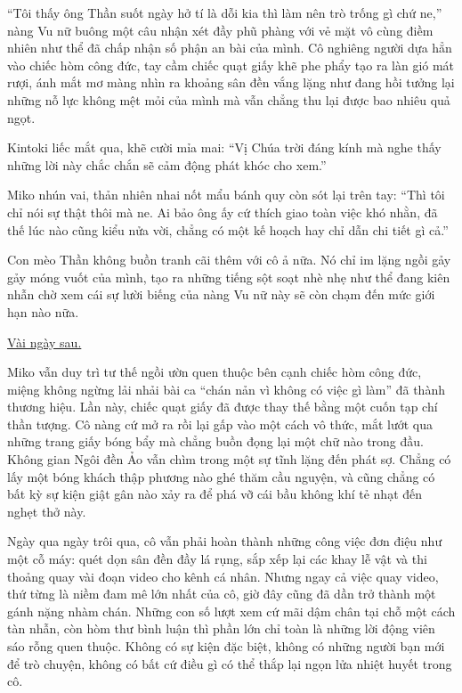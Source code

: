 \documentclass[../main.tex]{subfiles}
\begin{document}
``Tôi thấy ông Thần suốt ngày hở tí là dỗi kia thì làm nên trò trống gì chứ ne,'' nàng Vu nữ buông một câu nhận xét đầy phũ phàng với vẻ mặt vô cùng điềm nhiên như thể đã chấp nhận số phận an bài của mình. Cô nghiêng người dựa hẳn vào chiếc hòm công đức, tay cầm chiếc quạt giấy khẽ phe phẩy tạo ra làn gió mát rượi, ánh mắt mơ màng nhìn ra khoảng sân đền vắng lặng như đang hồi tưởng lại những nỗ lực không mệt mỏi của mình mà vẫn chẳng thu lại được bao nhiêu quả ngọt.

Kintoki liếc mắt qua, khẽ cười mỉa mai: ``Vị Chúa trời đáng kính mà nghe thấy những lời này chắc chắn sẽ cảm động phát khóc cho xem.''

Miko nhún vai, thản nhiên nhai nốt mẩu bánh quy còn sót lại trên tay: ``Thì tôi chỉ nói sự thật thôi mà ne. Ai bảo ông ấy cứ thích giao toàn việc khó nhằn, đã thế lúc nào cũng kiểu nửa vời, chẳng có một kế hoạch hay chỉ dẫn chi tiết gì cả.''

Con mèo Thần không buồn tranh cãi thêm với cô ả nữa. Nó chỉ im lặng ngồi gảy gảy móng vuốt của mình, tạo ra những tiếng sột soạt nhè nhẹ như thể đang kiên nhẫn chờ xem cái sự lười biếng của nàng Vu nữ này sẽ còn chạm đến mức giới hạn nào nữa.

\begin{center}
  \uline{Vài ngày sau.}
\end{center}

Miko vẫn duy trì tư thế ngồi ườn quen thuộc bên cạnh chiếc hòm công đức, miệng không ngừng lải nhải bài ca ``chán nản vì không có việc gì làm'' đã thành thương hiệu. Lần này, chiếc quạt giấy đã được thay thế bằng một cuốn tạp chí thần tượng. Cô nàng cứ mở ra rồi lại gấp vào một cách vô thức, mắt lướt qua những trang giấy bóng bẩy mà chẳng buồn đọng lại một chữ nào trong đầu. Không gian Ngôi đền Ảo vẫn chìm trong một sự tĩnh lặng đến phát sợ. Chẳng có lấy một bóng khách thập phương nào ghé thăm cầu nguyện, và cũng chẳng có bất kỳ sự kiện giật gân nào xảy ra để phá vỡ cái bầu không khí tẻ nhạt đến nghẹt thở này.

Ngày qua ngày trôi qua, cô vẫn phải hoàn thành những công việc đơn điệu như một cỗ máy: quét dọn sân đền đầy lá rụng, sắp xếp lại các khay lễ vật và thi thoảng quay vài đoạn video cho kênh cá nhân. Nhưng ngay cả việc quay video, thứ từng là niềm đam mê lớn nhất của cô, giờ đây cũng đã dần trở thành một gánh nặng nhàm chán. Những con số lượt xem cứ mãi dậm chân tại chỗ một cách tàn nhẫn, còn hòm thư bình luận thì phần lớn chỉ toàn là những lời động viên sáo rỗng quen thuộc. Không có sự kiện đặc biệt, không có những người bạn mới để trò chuyện, không có bất cứ điều gì có thể thắp lại ngọn lửa nhiệt huyết trong cô.
\end{document}
